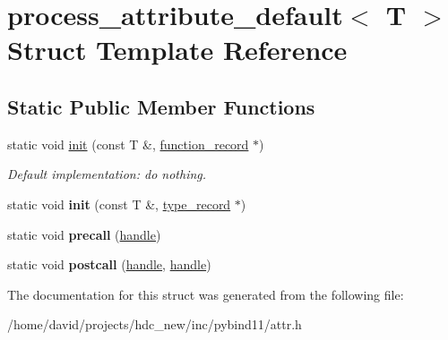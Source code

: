 \hypertarget{structprocess__attribute__default}{}\section{process\+\_\+attribute\+\_\+default$<$ T $>$ Struct Template Reference}
\label{structprocess__attribute__default}
\subsection*{Static Public Member Functions}
\begin{DoxyCompactItemize}
\item 
static void \hyperlink{structprocess__attribute__default_a5c9bf3410349e942871e45c5c0097a23}{init} (const T \&, \hyperlink{structfunction__record}{function\+\_\+record} $\ast$)\hypertarget{structprocess__attribute__default_a5c9bf3410349e942871e45c5c0097a23}{}\label{structprocess__attribute__default_a5c9bf3410349e942871e45c5c0097a23}

\begin{DoxyCompactList}\small\item\em Default implementation\+: do nothing. \end{DoxyCompactList}\item 
static void {\bfseries init} (const T \&, \hyperlink{structtype__record}{type\+\_\+record} $\ast$)\hypertarget{structprocess__attribute__default_af4eb354b90c89daf1c6430d8353c68bb}{}\label{structprocess__attribute__default_af4eb354b90c89daf1c6430d8353c68bb}

\item 
static void {\bfseries precall} (\hyperlink{classhandle}{handle})\hypertarget{structprocess__attribute__default_a1d0b4eb0906031a6ab235cec1916f291}{}\label{structprocess__attribute__default_a1d0b4eb0906031a6ab235cec1916f291}

\item 
static void {\bfseries postcall} (\hyperlink{classhandle}{handle}, \hyperlink{classhandle}{handle})\hypertarget{structprocess__attribute__default_a3754dc832d6966534c7f3bc96b75101f}{}\label{structprocess__attribute__default_a3754dc832d6966534c7f3bc96b75101f}

\end{DoxyCompactItemize}


The documentation for this struct was generated from the following file\+:\begin{DoxyCompactItemize}
\item 
/home/david/projects/hdc\+\_\+new/inc/pybind11/attr.\+h\end{DoxyCompactItemize}
